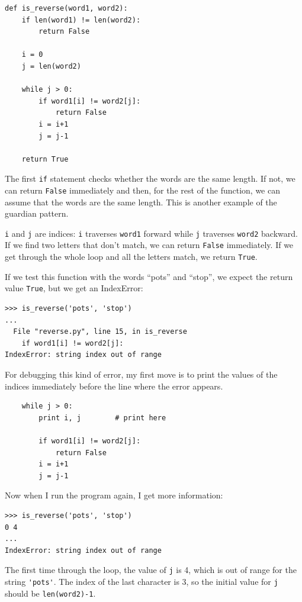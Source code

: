\documentclass[10pt]{book}
\begin{document}
\beforeverb
\begin{verbatim}
def is_reverse(word1, word2):
    if len(word1) != len(word2):
        return False
    
    i = 0
    j = len(word2)

    while j > 0:
        if word1[i] != word2[j]:
            return False
        i = i+1
        j = j-1

    return True
\end{verbatim}
\afterverb
%
The first {\tt if} statement checks whether the words are the
same length.  If not, we can return {\tt False} immediately
and then, for the rest of the function, we can assume that the words
are the same length.  This is another example of the guardian pattern.


{\tt i} and {\tt j} are indices: {\tt i} traverses {\tt word1}
forward while {\tt j} traverses {\tt word2} backward.  If we find
two letters that don't match, we can return {\tt False} immediately.
If we get through the whole loop and all the letters match, we
return {\tt True}.

If we test this function with the words ``pots'' and ``stop'', we
expect the return value {\tt True}, but we get an IndexError:


\beforeverb
\begin{verbatim}
>>> is_reverse('pots', 'stop')
...
  File "reverse.py", line 15, in is_reverse
    if word1[i] != word2[j]:
IndexError: string index out of range
\end{verbatim}
\afterverb
%
For debugging this kind of error, my first move is to
print the values of the indices immediately before the line
where the error appears.

\beforeverb
\begin{verbatim}
    while j > 0:
        print i, j        # print here
        
        if word1[i] != word2[j]:
            return False
        i = i+1
        j = j-1
\end{verbatim}
\afterverb
%
Now when I run the program again, I get more information:

\beforeverb
\begin{verbatim}
>>> is_reverse('pots', 'stop')
0 4
...
IndexError: string index out of range
\end{verbatim}
\afterverb
%
The first time through the loop, the value of {\tt j} is 4,
which is out of range for the string \verb"'pots'".
The index of the last character is 3, so the
initial value for {\tt j} should be {\tt len(word2)-1}.
\end{document}
